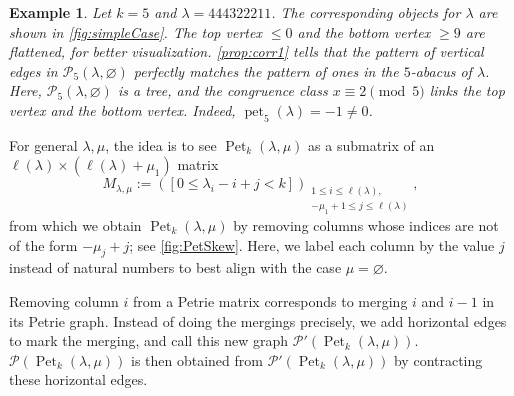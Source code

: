 \documentclass[pdflatex,sn-mathphys-num]{sn-jnl}%
\theoremstyle{thmstyleone}%
\theoremstyle{thmstyletwo}%
\newtheorem{example}[theorem]{Example}
\theoremstyle{thmstylethree}%
\numberwithin{equation}{section}
\DeclareMathOperator{\pet}{pet}
\DeclareMathOperator{\Pet}{Pet}
\begin{document}
	\begin{example}
		Let $k=5$ and $\lambda= 444322211$. The corresponding objects for $\lambda$ are shown in \cref{fig:simpleCase}. 
		The top vertex $\leq 0$ and the bottom vertex $\geq 9$ are flattened, for better visualization.
		\cref{prop:corr1} tells that the pattern of vertical edges in $\mathcal{P}_5(\lambda,\varnothing)$ perfectly matches the pattern of ones in the $5$-abacus of $\lambda$. Here, $\mathcal{P}_5(\lambda,\varnothing)$ is a tree, and the congruence class $x\equiv 2\pmod 5$ links the top vertex and the bottom vertex. Indeed, $\pet_5(\lambda)=-1\neq 0$.
	\end{example}
    
	For general $\lambda,\mu$, the idea is to see $\Pet_k(\lambda,\mu)$ as a submatrix of an $\ell(\lambda) \times (\ell(\lambda)+\mu_1)$ matrix
	\[M_{\lambda,\mu}:=([0\leq \lambda_i-i+j < k])_{\substack{1\leq i\leq \ell(\lambda),\\ -\mu_1+1\leq j\leq \ell(\lambda)}},\]
	from which we obtain $\Pet_k(\lambda,\mu)$ by removing columns whose indices are not of the form $-\mu_j+j$; see \cref{fig:PetSkew}. Here, we label each column by the value $j$ instead of natural numbers to best align with the case $\mu=\varnothing$. 
	
	Removing column $i$ from a Petrie matrix corresponds to merging $i$ and $i-1$ in its Petrie graph. Instead of doing the mergings precisely, we add horizontal edges to mark the merging, and call this new graph $\mathcal{P}'(\Pet_k(\lambda,\mu))$. $\mathcal{P}(\Pet_k(\lambda,\mu))$ is then obtained from $\mathcal{P}'(\Pet_k(\lambda,\mu))$ by contracting these horizontal edges.
    
\end{document}
